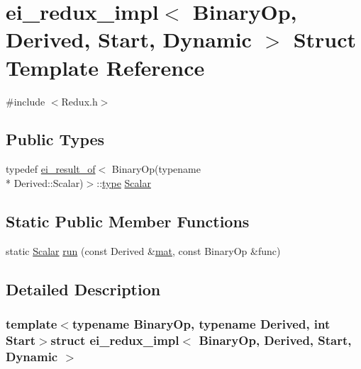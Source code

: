 \hypertarget{structei__redux__impl_3_01_binary_op_00_01_derived_00_01_start_00_01_dynamic_01_4}{\section{ei\-\_\-redux\-\_\-impl$<$ Binary\-Op, Derived, Start, Dynamic $>$ Struct Template Reference}
\label{structei__redux__impl_3_01_binary_op_00_01_derived_00_01_start_00_01_dynamic_01_4}
}


{\ttfamily \#include $<$Redux.\-h$>$}

\subsection*{Public Types}
\begin{DoxyCompactItemize}
\item 
typedef \hyperlink{structei__result__of}{ei\-\_\-result\-\_\-of}$<$ Binary\-Op(typename \\*
Derived\-::\-Scalar)$>$\-::\hyperlink{glext_8h_a7d05960f4f1c1b11f3177dc963a45d86}{type} \hyperlink{structei__redux__impl_3_01_binary_op_00_01_derived_00_01_start_00_01_dynamic_01_4_a163cba425594672ded8680b15b73f758}{Scalar}
\end{DoxyCompactItemize}
\subsection*{Static Public Member Functions}
\begin{DoxyCompactItemize}
\item 
static \hyperlink{structei__redux__impl_3_01_binary_op_00_01_derived_00_01_start_00_01_dynamic_01_4_a163cba425594672ded8680b15b73f758}{Scalar} \hyperlink{structei__redux__impl_3_01_binary_op_00_01_derived_00_01_start_00_01_dynamic_01_4_ae262cddd532b943bf8d79f9c8a38bcaa}{run} (const Derived \&\hyperlink{uavobjecttemplate_8m_a16a51e808b16c46bbfd36da2e37cd123}{mat}, const Binary\-Op \&func)
\end{DoxyCompactItemize}


\subsection{Detailed Description}
\subsubsection*{template$<$typename Binary\-Op, typename Derived, int Start$>$struct ei\-\_\-redux\-\_\-impl$<$ Binary\-Op, Derived, Start, Dynamic $>$}



